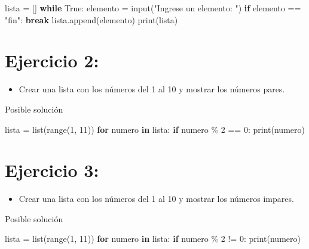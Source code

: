 \documentclass[
  a4paper,
  DIV=11,
  numbers=noendperiod,
  onepage,
  openany]{scrreprt}
\newenvironment{Shaded}{\begin{snugshade}}{\end{snugshade}}
\newcommand{\BuiltInTok}[1]{\textcolor[rgb]{0.00,0.23,0.31}{#1}}
\newcommand{\ControlFlowTok}[1]{\textcolor[rgb]{0.00,0.23,0.31}{\textbf{#1}}}
\newcommand{\DecValTok}[1]{\textcolor[rgb]{0.68,0.00,0.00}{#1}}
\newcommand{\KeywordTok}[1]{\textcolor[rgb]{0.00,0.23,0.31}{\textbf{#1}}}
\newcommand{\NormalTok}[1]{\textcolor[rgb]{0.00,0.23,0.31}{#1}}
\newcommand{\OperatorTok}[1]{\textcolor[rgb]{0.37,0.37,0.37}{#1}}
\newcommand{\StringTok}[1]{\textcolor[rgb]{0.13,0.47,0.30}{#1}}
\newcommand{\VariableTok}[1]{\textcolor[rgb]{0.07,0.07,0.07}{#1}}
\providecommand{\tightlist}{%
  \setlength{\itemsep}{0pt}\setlength{\parskip}{0pt}}\usepackage{longtable,booktabs,array}
\begin{document}
\begin{tcolorbox}
\begin{Shaded}
\begin{Highlighting}[]
\NormalTok{lista }\OperatorTok{=}\NormalTok{ []}
\ControlFlowTok{while} \VariableTok{True}\NormalTok{:}
\NormalTok{    elemento }\OperatorTok{=} \BuiltInTok{input}\NormalTok{(}\StringTok{"Ingrese un elemento: "}\NormalTok{)}
    \ControlFlowTok{if}\NormalTok{ elemento }\OperatorTok{==} \StringTok{"fin"}\NormalTok{:}
        \ControlFlowTok{break}
\NormalTok{    lista.append(elemento)}
\BuiltInTok{print}\NormalTok{(lista)}
\end{Highlighting}
\end{Shaded}

\section{Ejercicio 2:}\label{ejercicio-2-3}

\begin{itemize}
\tightlist
\item
  Crear una lista con los números del 1 al 10 y mostrar los números
  pares.
\end{itemize}

Posible solución

\begin{Shaded}
\begin{Highlighting}[]
\NormalTok{lista }\OperatorTok{=} \BuiltInTok{list}\NormalTok{(}\BuiltInTok{range}\NormalTok{(}\DecValTok{1}\NormalTok{, }\DecValTok{11}\NormalTok{))}
\ControlFlowTok{for}\NormalTok{ numero }\KeywordTok{in}\NormalTok{ lista:}
    \ControlFlowTok{if}\NormalTok{ numero }\OperatorTok{\%} \DecValTok{2} \OperatorTok{==} \DecValTok{0}\NormalTok{:}
        \BuiltInTok{print}\NormalTok{(numero)}
\end{Highlighting}
\end{Shaded}

\section{Ejercicio 3:}\label{ejercicio-3-3}

\begin{itemize}
\tightlist
\item
  Crear una lista con los números del 1 al 10 y mostrar los números
  impares.
\end{itemize}

Posible solución

\begin{Shaded}
\begin{Highlighting}[]
\NormalTok{lista }\OperatorTok{=} \BuiltInTok{list}\NormalTok{(}\BuiltInTok{range}\NormalTok{(}\DecValTok{1}\NormalTok{, }\DecValTok{11}\NormalTok{))}
\ControlFlowTok{for}\NormalTok{ numero }\KeywordTok{in}\NormalTok{ lista:}
    \ControlFlowTok{if}\NormalTok{ numero }\OperatorTok{\%} \DecValTok{2} \OperatorTok{!=} \DecValTok{0}\NormalTok{:}
        \BuiltInTok{print}\NormalTok{(numero)}
\end{Highlighting}
\end{Shaded}


\end{tcolorbox}
\end{document}
